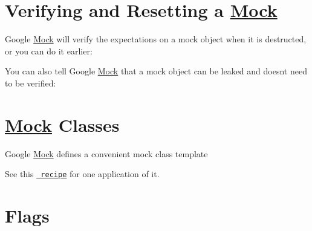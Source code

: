 \section*{Verifying and Resetting a \mbox{\hyperlink{class_mock}{Mock}}}

Google \mbox{\hyperlink{class_mock}{Mock}} will verify the expectations on a mock object when it is destructed, or you can do it earlier\+: 
\begin{DoxyCode}{0}
\DoxyCodeLine{\textcolor{comment}{// Verifies and removes the expectations on mock\_obj;}}
\DoxyCodeLine{\textcolor{comment}{// returns true iff successful.}}
\DoxyCodeLine{\textcolor{comment}{// Verifies and removes the expectations on mock\_obj;}}
\DoxyCodeLine{\textcolor{comment}{// also removes the default actions set by ON\_CALL();}}
\DoxyCodeLine{\textcolor{comment}{// returns true iff successful.}}
\end{DoxyCode}


You can also tell Google \mbox{\hyperlink{class_mock}{Mock}} that a mock object can be leaked and doesn\textquotesingle{}t need to be verified\+: 
\begin{DoxyCode}{0}
\end{DoxyCode}


\section*{\mbox{\hyperlink{class_mock}{Mock}} Classes}

Google \mbox{\hyperlink{class_mock}{Mock}} defines a convenient mock class template 
\begin{DoxyCode}{0}
\DoxyCodeLine{ \textcolor{keyword}{public}:}
\DoxyCodeLine{\};}
\end{DoxyCode}
 See this \href{CookBook.md\#using-check-points}{\texttt{ recipe}} for one application of it.

\section*{Flags}

